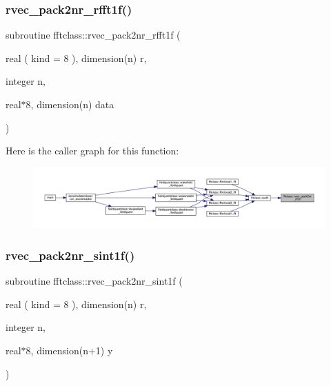 \subsubsection{\texorpdfstring{rvec\_pack2nr\_rfft1f()}{rvec\_pack2nr\_rfft1f()}}
{\footnotesize\ttfamily subroutine fftclass\+::rvec\+\_\+pack2nr\+\_\+rfft1f (\begin{DoxyParamCaption}\item[{real ( kind = 8 ), dimension(n)}]{r,  }\item[{integer}]{n,  }\item[{real$\ast$8, dimension(n)}]{data }\end{DoxyParamCaption})}

Here is the caller graph for this function\+:\nopagebreak
\begin{figure}[H]
\begin{center}
\leavevmode
\includegraphics[width=350pt]{namespacefftclass_ac898bf50e64ca8c43e8d9fa0c2c85919_icgraph}
\end{center}
\end{figure}
\mbox{\label{namespacefftclass_a667b3d13eccd40bf9e60f379f6d44e04}} 
\subsubsection{\texorpdfstring{rvec\_pack2nr\_sint1f()}{rvec\_pack2nr\_sint1f()}}
{\footnotesize\ttfamily subroutine fftclass\+::rvec\+\_\+pack2nr\+\_\+sint1f (\begin{DoxyParamCaption}\item[{real ( kind = 8 ), dimension(n)}]{r,  }\item[{integer}]{n,  }\item[{real$\ast$8, dimension(n+1)}]{y }\end{DoxyParamCaption})}

